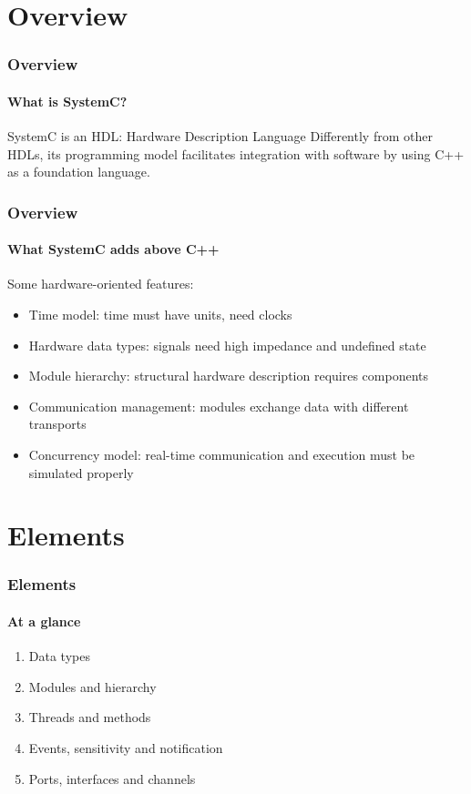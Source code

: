 \section{Overview}

\begin{frame}
\frametitle{Overview}
\framesubtitle{What is SystemC?}

\begin{block}{SystemC is an HDL: Hardware Description Language}
Differently from other HDLs, its programming model facilitates integration with software by using C++ as a foundation language.
\end{block}

\end{frame}

\begin{frame}
\frametitle{Overview}
\framesubtitle{What SystemC adds above C++}

\begin{block}{Some hardware-oriented features:}
\begin{itemize}
\item Time model: time must have units, need clocks
\pause
\item Hardware data types: signals need high impedance and undefined state
\pause
\item Module hierarchy: structural hardware description requires components
\pause
\item Communication management: modules exchange data with different transports
\pause
\item Concurrency model: real-time communication and execution must be simulated properly
\end{itemize}
\end{block}

\end{frame}

\section{Elements}

\begin{frame}
\frametitle{Elements}
\framesubtitle{At a glance}

\begin{enumerate}
\item Data types
\item Modules and hierarchy
\item Threads and methods
\item Events, sensitivity and notification
\item Ports, interfaces and channels
\end{enumerate}

\end{frame}

